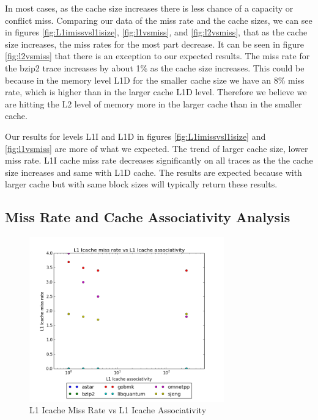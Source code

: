 \documentclass{article}
\begin{document}
In most cases, as the cache size increases there is less chance of a capacity or conflict miss. Comparing our data of the miss rate and the cache sizes, we can see in figures \ref{fig:L1imissvsl1isize}, \ref{fig:l1vsmiss}, and \ref{fig:l2vsmiss}, that as the cache size increases, the miss rates for the most part decrease. It can be seen in figure \ref{fig:l2vsmiss} that there is an exception to our expected results. The miss rate for the bzip2 trace increases by about 1\% as the cache size increases. This could be because in the memory level L1D for the smaller cache size we have an 8\% miss rate, which is higher than in the larger cache L1D level. Therefore we believe we are hitting the L2 level of memory more in the larger cache than in the smaller cache.

Our results for levels L1I and L1D in figures \ref{fig:L1imissvsl1isize} and \ref{fig:l1vsmiss} are more of what we expected. The trend of larger cache size, lower miss rate. L1I cache miss rate decreases significantly on all traces as the the cache size increases and same with L1D cache. The results are expected because with larger cache but with same block sizes will typically return these results. 

\subsection{Miss Rate and Cache Associativity Analysis}

\begin{figure}[ht]
    \centering
    \includegraphics[width=0.75\textwidth]{plots/L1icache_miss_vs_L1icache_Assoc.png}
    \caption{L1 Icache Miss Rate vs L1 Icache Associativity}
    \label{fig:L1imissvsl1iassoc}
\end{figure}
\end{document}
